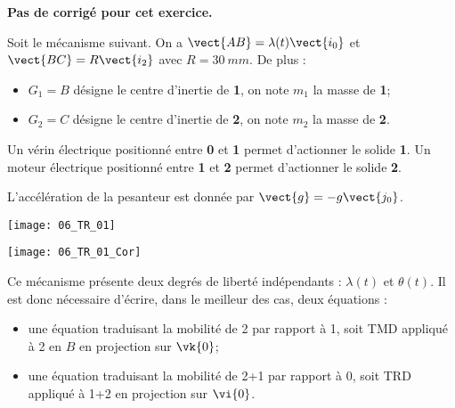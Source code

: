\normaltrue
\correctionfalse


\setcounter{numques}{0}
\ifcorrection
\else
\textbf{Pas de corrigé pour cet exercice.}
\fi

\ifprof
\else
Soit le mécanisme suivant. On a $\vect{AB}=\lambda(t)\vect{i_0}$ et $\vect{BC}=R\vect{i_2}$ avec $R=\SI{30}{mm}$.
De plus :
\begin{itemize}
\item $G_1=B$ désigne le centre d'inertie de \textbf{1}, on note $m_1$ la masse de \textbf{1};%
\item $G_2=C$ désigne le centre d'inertie de \textbf{2}, on note $m_2$ la masse de \textbf{2}.%
\end{itemize}

Un vérin électrique positionné entre \textbf{0} et \textbf{1}  permet d'actionner le solide \textbf{1}.
Un moteur électrique positionné entre \textbf{1} et \textbf{2}  permet d'actionner le solide \textbf{2}.

L'accélération de la pesanteur est donnée par $\vect{g}=-g\vect{j_0}$.

\begin{center}
\texttt{[image: 06\_TR\_01]}
\end{center}
\fi

\ifprof
\begin{center}
\texttt{[image: 06\_TR\_01\_Cor]}
\end{center}
\else
\fi

\ifprof
Ce mécanisme présente deux degrés de liberté indépendants : $\lambda(t)$ et $\theta(t)$. Il est donc nécessaire d'écrire, dans le meilleur des cas, deux équations :
\begin{itemize}
\item une équation traduisant la mobilité de 2 par rapport à 1, soit TMD appliqué à 2 en $B$ en projection sur $\vk{0}$;
\item une équation traduisant la mobilité de 2+1 par rapport à 0, soit TRD appliqué à 1+2 en projection sur $\vi{0}$.
\end{itemize}

